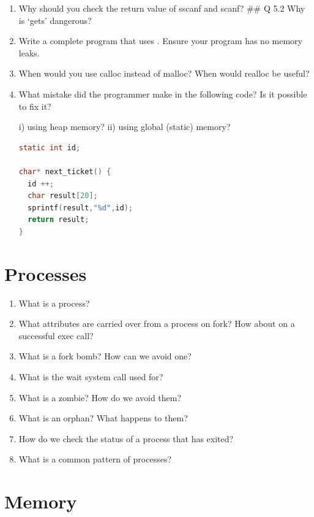 \begin{enumerate}
\item Why should you check the return value of sscanf and scanf? \#\# Q 5.2 Why is `gets' dangerous?

\item Write a complete program that uses . Ensure your program has no memory leaks.

\item When would you use calloc instead of malloc? When would realloc be useful?

\item What mistake did the programmer make in the following code? Is it possible to fix it?

i) using heap memory?
ii) using global (static) memory?

\begin{lstlisting}[language=C]
static int id;

char* next_ticket() {
  id ++;
  char result[20];
  sprintf(result,"%d",id);
  return result;
}
\end{lstlisting}

\end{enumerate}

\section{Processes}

\begin{enumerate}
\item What is a process?
\item What attributes are carried over from a process on fork? How about on a successful exec call?
\item What is a fork bomb? How can we avoid one?
\item What is the wait system call used for?
\item What is a zombie? How do we avoid them?
\item What is an orphan? What happens to them?
\item How do we check the status of a process that has exited?
\item What is a common pattern of processes?
\end{enumerate}

\section{Memory}

